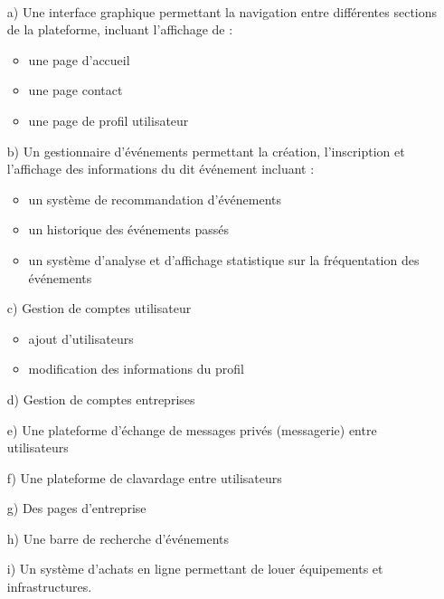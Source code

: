 \documentclass[letter,12pt]{exam}
\begin{document}
\vspace{0.5cm}
\\

\begin{itemize}
\tightlist
\item[a)]
  Une interface graphique permettant la navigation entre différentes
  sections de la plateforme, incluant l'affichage de :

  \begin{itemize}
  \tightlist
  \item
    une page d'accueil
  \item
    une page contact
  \item
    une page de profil utilisateur
  \end{itemize}

\newpage
\item[b)]
  Un gestionnaire d'événements permettant la création, l'inscription et
  l'affichage des informations du dit événement incluant :

  \begin{itemize}
  \tightlist
  \item
    un système de recommandation d'événements
  \item
    un historique des événements passés
  \item
    un système d'analyse et d'affichage statistique sur la fréquentation
    des événements
  \end{itemize}
\item[c)]
  Gestion de comptes utilisateur

  \begin{itemize}
  \tightlist
  \item
    ajout d'utilisateurs
  \item
    modification des informations du profil
  \end{itemize}
\item[d)]
  Gestion de comptes entreprises
\item[e)]
  Une plateforme d'échange de messages privés (messagerie) entre
  utilisateurs
\item[f)]
  Une plateforme de clavardage entre utilisateurs
\item[g)]
  Des pages d'entreprise
\item[h)]
  Une barre de recherche d'événements
\item[i)]
  Un système d'achats en ligne permettant de louer équipements et
  infrastructures.
\end{itemize}
\end{document}
